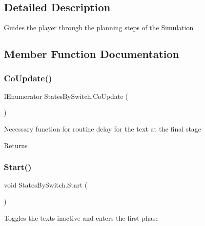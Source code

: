 \subsection{Detailed Description}
Guides the player through the planning steps of the Simulation 



\subsection{Member Function Documentation}
\mbox{\label{class_states_by_switch_abdcace6428d6394da78e41b19483e813}} 
\subsubsection{\texorpdfstring{Co\+Update()}{CoUpdate()}}
{\footnotesize\ttfamily I\+Enumerator States\+By\+Switch.\+Co\+Update (\begin{DoxyParamCaption}{ }\end{DoxyParamCaption})\hspace{0.3cm}{\ttfamily [private]}}



Necessary function for routine delay for the text at the final stage 

\begin{DoxyReturn}{Returns}

\end{DoxyReturn}
\mbox{\label{class_states_by_switch_a21dce0c656d329bd4890e0ec07c6b8c9}} 
\subsubsection{\texorpdfstring{Start()}{Start()}}
{\footnotesize\ttfamily void States\+By\+Switch.\+Start (\begin{DoxyParamCaption}{ }\end{DoxyParamCaption})}



Toggles the texts inactive and enters the first phase 

\mbox{\label{class_states_by_switch_adb2e0b871f32a901e5a9a4554cd3f797}} 
